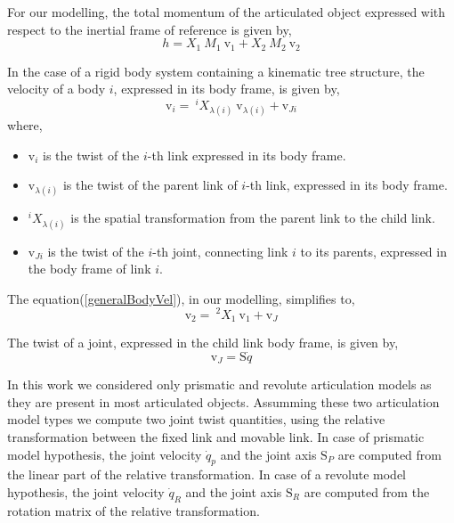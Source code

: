 \documentclass[12pt,a4paper]{report}
\begin{document}
For our modelling, the total momentum of the articulated object expressed with respect to the inertial frame of reference is given by,
\begin{equation}
  h =  X_1 \ M_1 \ \mathrm{v}_1 + X_2 \ M_2 \ \mathrm{v}_2
 \label{totalMom}
\end{equation}

In the case of a rigid body system containing a kinematic tree structure, the velocity of a body $i$, expressed in its body frame, is given by,
\begin{equation}
  \mathrm{v}_i = \  ^iX_{\lambda(i)} \ \mathrm{v}_{\lambda(i)} + \mathrm{v}_{Ji}
  \label{generalBodyVel}
\end{equation}
where,
  \begin{itemize}
    \item $\mathrm{v}_i$ is the twist of the $i$-th link expressed in its body frame.
    \item $\mathrm{v}_{\lambda(i)}$ is the twist of the parent link of $i$-th link, expressed in its body frame. 
    \item $^iX_{\lambda(i)}$ is the spatial transformation from the parent link to the child link.
    \item $\mathrm{v}_{Ji}$ is the twist of the $i$-th joint, connecting link $i$ to its parents, expressed in the body frame of link $i$.
  \end{itemize}
   
  The equation(\ref{generalBodyVel}), in our modelling, simplifies to,
  \begin{equation}
    \mathrm{v}_2 = \  ^2X_{1} \ \mathrm{v}_{1} + \mathrm{v}_{J}
  \label{bodyVel}
  \end{equation} 
  
   The twist of a joint, expressed in the child link body frame, is given by,
  \begin{equation}
    \mathrm{v}_{J} = \mathrm{S}\dot{q}
    \label{jointVel}
  \end{equation}
  
  In this work we considered only prismatic and revolute articulation models as they are present in most articulated objects. Assumming these two articulation model types we compute two joint twist quantities, using the relative transformation between the fixed link and movable link. In case of prismatic model hypothesis, the joint velocity $\dot{q}_p$ and the joint axis $\mathrm{S}_P$ are computed from the linear part of the relative transformation. In case of a revolute model hypothesis, the joint velocity $\dot{q}_R$ and the joint axis $\mathrm{S}_R$ are computed from the rotation matrix of the relative transformation. 
  
\end{document}
